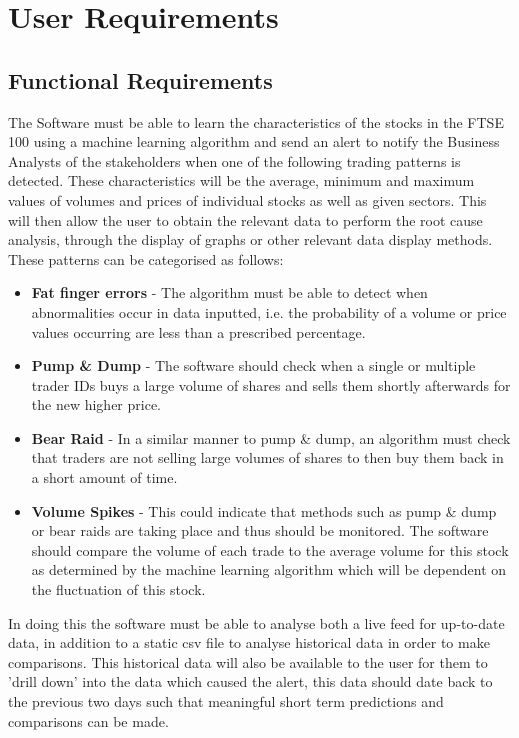 \documentclass[10pt, oneside, a4paper]{article}
\begin{document}
\section{User Requirements}
\subsection{Functional Requirements}
The Software must be able to learn the characteristics of the stocks in the FTSE 100 using a machine learning
algorithm and send an alert to notify the Business Analysts of the stakeholders when one of the following
trading patterns is detected. These characteristics will be the average, minimum and maximum values of volumes
and prices of individual stocks as well as given sectors. This will then allow the user to obtain the relevant
data to perform the root cause analysis, through the display of graphs or other relevant data display methods.
These patterns can be categorised as follows:
\begin{itemize}
	\item \textbf{Fat finger errors} -  The algorithm must be able to detect when abnormalities occur in data inputted,
	i.e. the probability of a volume or price values occurring are less than a prescribed percentage.
	\item \textbf{Pump \& Dump} - The software should check when a single or multiple trader IDs buys a large volume of
	shares and sells them shortly afterwards for the new higher price.
	\item \textbf{Bear Raid} - In a similar manner to pump \& dump, an algorithm must check that traders are not selling
	large volumes of shares to then buy them back in a short amount of time.
	\item \textbf{Volume Spikes} - This could indicate that methods such as pump \& dump or bear raids are taking place
	and thus should be monitored. The software should compare the volume of each trade to the average volume for
	this stock as determined by the machine learning algorithm which will be dependent on the fluctuation of this stock.
\end{itemize}

In doing this the software must be able to analyse both a live feed for up-to-date data, in addition to a static
csv file to analyse historical data in order to make comparisons. This historical data will also be available to
the user for them to 'drill down' into the data which caused the alert, this data should date back to the previous
two days such that meaningful short term predictions and comparisons can be made.
\end{document}
